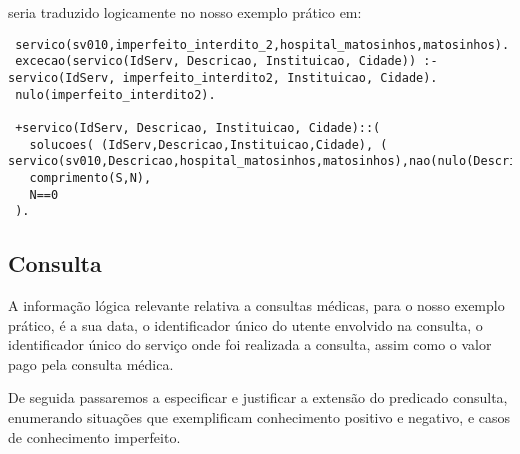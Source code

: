 \documentclass[
  oneside,
  10pt, a4paper,
  footinclude=true,
  headinclude=true,
  cleardoublepage=empty
]{scrbook}
\begin{document}
seria traduzido logicamente  no nosso exemplo prático em:


\begin{lstlisting}
 servico(sv010,imperfeito_interdito_2,hospital_matosinhos,matosinhos).
 excecao(servico(IdServ, Descricao, Instituicao, Cidade)) :- servico(IdServ, imperfeito_interdito2, Instituicao, Cidade).
 nulo(imperfeito_interdito2).
 
 +servico(IdServ, Descricao, Instituicao, Cidade)::(
   solucoes( (IdServ,Descricao,Instituicao,Cidade), ( servico(sv010,Descricao,hospital_matosinhos,matosinhos),nao(nulo(Descricao))),S),
   comprimento(S,N),
   N==0
 ).
 \end{lstlisting}   
   
   
   
   
   
   
   
   
   
   
   
   
   
   
   
   
   
   
   
   
   
   
   
   
   
   
   
   
   
   
   
   
   
   
   
   
        
      \subsection{Consulta}
        A informação lógica relevante relativa a consultas médicas, para o nosso exemplo prático, é a sua data, o identificador único do utente envolvido na consulta, o identificador único do serviço onde foi realizada a consulta, assim como o valor pago pela consulta médica. \par 
        De seguida passaremos a especificar e justificar a extensão do predicado consulta, enumerando situações que exemplificam conhecimento positivo e negativo, e casos de conhecimento imperfeito.\par 
        
\end{document}
